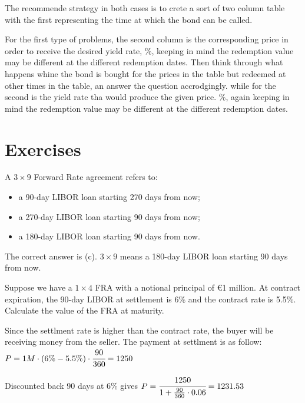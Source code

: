\documentclass[12pt,a4paper]{book}
\begin{document}
The recommende strategy in both cases is to crete a sort of two column table with the first representing the time at which the bond can be called.

For the first type of problems, the second column is the corresponding price in order to receive the desired yield rate, \%, keeping in mind the redemption value may be different at the different redemption dates. Then think through what happens whine the bond is bought for the prices in the table but redeemed at other times in the table, an answer the question accrodgingly.
while for the second is the yield rate tha would produce the given price. \%, again keeping in mind the redemption value may be different at the different redemption dates.

\section*{Exercises}
\begin{exercise}[subtitle=Forward Rate Agreement]
A $3\times 9$ Forward Rate agreement refers to:
\begin{itemize}
\item a 90-day LIBOR loan starting 270 days from now;
\item a 270-day LIBOR loan starting 90 days from now;
\item a 180-day LIBOR loan starting 90 days from now.
\end{itemize}
\end{exercise}
\begin{solution}
The correct answer is (c). $3\times 9$ means a 180-day LIBOR loan starting 90 days from now.
\end{solution}

\begin{exercise}[subtitle=FRA Valuation]
Suppose we have a $1\times 4$ FRA with a notional principal of €1 million. 
At contract expiration, the 90-day LIBOR at settlement is 6\% and the contract rate is 5.5\%.
Calculate the value of the FRA at maturity.
\end{exercise}
\begin{solution}
Since the settlment rate is higher than the contract rate, the buyer will be receiving money from the seller. The payment at settlment is as follow:
$P = 1M\cdot(6\%-5.5\%)\cdot \cfrac{90}{360} = 1250$

Discounted back 90 days at 6\% gives
$P = \cfrac{1250}{1+\frac{90}{360}\cdot0.06} = 1231.53$
\end{solution}
\end{document}
